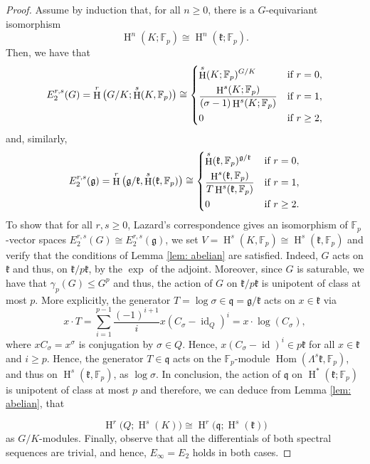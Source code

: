 \documentclass[10pt,a4paper]{amsart}
\DeclareMathOperator{\HH}{H}
\DeclareMathOperator{\Hom}{Hom}
\DeclareMathOperator{\id}{id}
\newcommand{\Fp}{\mathbb{F}_p}
\newcommand{\F}{\mathbb{F}}
\newcommand{\g}{\mathfrak{g}}
\newcommand{\isom}{\cong}
\newcommand{\kk}{\mathfrak{k}}
\newcommand{\q}{\mathfrak{q}}
\begin{document}
	\begin{proof}
	
	Assume by induction that, for all $n\geq 0$, there is a $G$-equivariant isomorphism $$\HH^n(K;\Fp)\isom\HH^n(\kk;\Fp).$$
	Then, we have that 
	\begin{displaymath}
		E_2^{r,s}(G)=\HH^r\big(G/K;\HH^s(K,\Fp)\big)\isom \begin{dcases}
			\HH^s(K;\Fp)^{G/K} & \text{if } r=0, \\
			\frac{\HH^s(K;\Fp)}{(\sigma-1)\HH^s(K;\Fp)} & \text{if } r=1, \\
			0 & \text{if } r\geq 2, \\
		\end{dcases}
	\end{displaymath}
	and, similarly,
	\begin{displaymath}
		E_2^{r,s}(\g)=\HH^r\big(\g/\kk,\HH^s(\kk,\Fp)\big)\isom \begin{dcases}
			\HH^s(\kk,\Fp)^{\g/\kk} & \text{if } r=0, \\
			\frac{\HH^s(\kk,\Fp)}{T\HH^s(\kk,\Fp)} & \text{if } r=1, \\
			0 & \text{if } r\geq 2. \\
		\end{dcases}
	\end{displaymath}
To show that for all $r,s\geq 0$, Lazard's correspondence gives an isomorphism of $\F_p$-vector spaces $E^{r,s}_2(G)\cong E^{r,s}_2(\g)$, we set $V=\HH^s(K,\Fp)\isom \HH^s(\kk,\Fp)$ and verify that the conditions of Lemma \ref{lem: abelian} are satisfied. Indeed, $G$ acts on $\kk$ and thus, on $\kk/p\kk$, by the $\exp$ of the adjoint. Moreover, since $G$ is saturable, we have that $\gamma_p(G)\leq G^p$ and  thus, the action of $G$ on $\kk/p\kk$ is unipotent of class at most $p$. More explicitly, the generator $T=\log \sigma\in \q=\g/\kk$ acts on $x\in \kk$ via
	\begin{displaymath}
		x\cdot T=\sum_{i=1}^{p-1}\frac{(-1)^{i+1}}{i}x(C_\sigma-\id_Q)^i =x\cdot\log(C_{\sigma}),
	\end{displaymath}
	where $xC_\sigma=x^\sigma$ is conjugation by $\sigma\in Q$. Hence, $x(C_\sigma-\id)^i\in p\kk$ for all $x\in \kk$ and $i\geq p$. Hence, the generator $T\in\q$ acts on the $\Fp$-module $\Hom(\Lambda^s \kk,\Fp)$, and thus on $\HH^s(\kk,\Fp)$, as $\log \sigma$. In conclusion, the action of $\q$ on $\HH^*(\kk;\F_p)$ is unipotent of class at most $p$ and therefore, we can deduce from Lemma \ref{lem: abelian}, that
	
	\begin{displaymath}
		\HH^r\big(Q;\HH^s(K)\big) \isom \HH^r\big(\q;\HH^s(\kk)\big)
	\end{displaymath}
	as $G/K$-modules. Finally, observe that all the differentials of both spectral sequences are trivial, and hence, $E_{\infty}=E_2$ holds in both cases.
	\end{proof}
\end{document}
